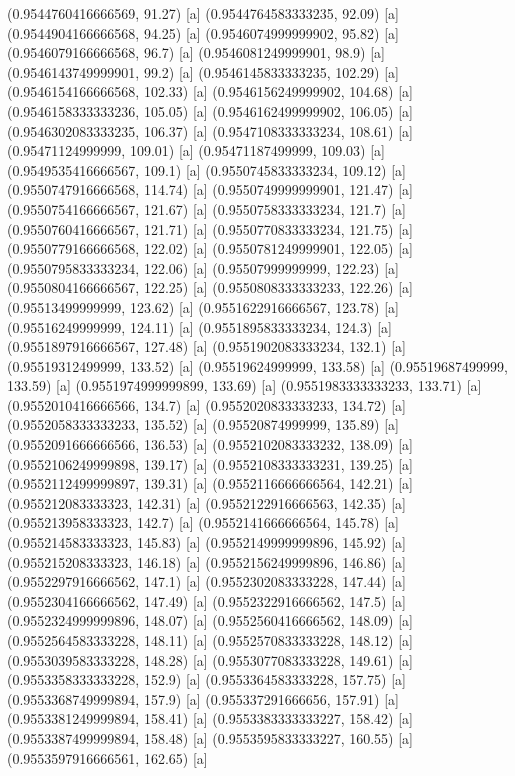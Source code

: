 {{{(0.9544760416666569, 91.27) [a] 
(0.9544764583333235, 92.09) [a] 
(0.9544904166666568, 94.25) [a] 
(0.9546074999999902, 95.82) [a] 
(0.9546079166666568, 96.7) [a] 
(0.9546081249999901, 98.9) [a] 
(0.9546143749999901, 99.2) [a] 
(0.9546145833333235, 102.29) [a] 
(0.9546154166666568, 102.33) [a] 
(0.9546156249999902, 104.68) [a] 
(0.9546158333333236, 105.05) [a] 
(0.9546162499999902, 106.05) [a] 
(0.9546302083333235, 106.37) [a] 
(0.9547108333333234, 108.61) [a] 
(0.95471124999999, 109.01) [a] 
(0.95471187499999, 109.03) [a] 
(0.9549535416666567, 109.1) [a] 
(0.9550745833333234, 109.12) [a] 
(0.9550747916666568, 114.74) [a] 
(0.9550749999999901, 121.47) [a] 
(0.9550754166666567, 121.67) [a] 
(0.9550758333333234, 121.7) [a] 
(0.9550760416666567, 121.71) [a] 
(0.9550770833333234, 121.75) [a] 
(0.9550779166666568, 122.02) [a] 
(0.9550781249999901, 122.05) [a] 
(0.9550795833333234, 122.06) [a] 
(0.95507999999999, 122.23) [a] 
(0.9550804166666567, 122.25) [a] 
(0.9550808333333233, 122.26) [a] 
(0.95513499999999, 123.62) [a] 
(0.9551622916666567, 123.78) [a] 
(0.95516249999999, 124.11) [a] 
(0.9551895833333234, 124.3) [a] 
(0.9551897916666567, 127.48) [a] 
(0.9551902083333234, 132.1) [a] 
(0.95519312499999, 133.52) [a] 
(0.95519624999999, 133.58) [a] 
(0.95519687499999, 133.59) [a] 
(0.9551974999999899, 133.69) [a] 
(0.9551983333333233, 133.71) [a] 
(0.9552010416666566, 134.7) [a] 
(0.9552020833333233, 134.72) [a] 
(0.9552058333333233, 135.52) [a] 
(0.95520874999999, 135.89) [a] 
(0.9552091666666566, 136.53) [a] 
(0.9552102083333232, 138.09) [a] 
(0.9552106249999898, 139.17) [a] 
(0.9552108333333231, 139.25) [a] 
(0.9552112499999897, 139.31) [a] 
(0.9552116666666564, 142.21) [a] 
(0.955212083333323, 142.31) [a] 
(0.9552122916666563, 142.35) [a] 
(0.955213958333323, 142.7) [a] 
(0.9552141666666564, 145.78) [a] 
(0.955214583333323, 145.83) [a] 
(0.9552149999999896, 145.92) [a] 
(0.955215208333323, 146.18) [a] 
(0.9552156249999896, 146.86) [a] 
(0.9552297916666562, 147.1) [a] 
(0.9552302083333228, 147.44) [a] 
(0.9552304166666562, 147.49) [a] 
(0.9552322916666562, 147.5) [a] 
(0.9552324999999896, 148.07) [a] 
(0.9552560416666562, 148.09) [a] 
(0.9552564583333228, 148.11) [a] 
(0.9552570833333228, 148.12) [a] 
(0.9553039583333228, 148.28) [a] 
(0.9553077083333228, 149.61) [a] 
(0.9553358333333228, 152.9) [a] 
(0.9553364583333228, 157.75) [a] 
(0.9553368749999894, 157.9) [a] 
(0.955337291666656, 157.91) [a] 
(0.9553381249999894, 158.41) [a] 
(0.9553383333333227, 158.42) [a] 
(0.9553387499999894, 158.48) [a] 
(0.9553595833333227, 160.55) [a] 
(0.9553597916666561, 162.65) [a] 
}}}
